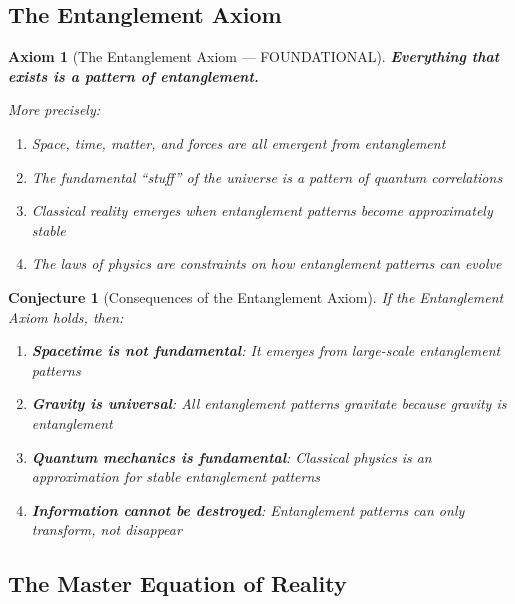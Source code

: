 \documentclass[12pt,a4paper]{article}
\newtheorem{conjecture}[theorem]{Conjecture}
\newtheorem{axiom}[theorem]{Axiom}
\begin{document}
\subsection{The Entanglement Axiom}

\begin{axiom}[The Entanglement Axiom --- FOUNDATIONAL]
\textbf{Everything that exists is a pattern of entanglement.}

More precisely:
\begin{enumerate}
    \item Space, time, matter, and forces are all emergent from entanglement
    \item The fundamental ``stuff'' of the universe is a pattern of quantum correlations
    \item Classical reality emerges when entanglement patterns become approximately stable
    \item The laws of physics are constraints on how entanglement patterns can evolve
\end{enumerate}
\end{axiom}

\begin{conjecture}[Consequences of the Entanglement Axiom]
If the Entanglement Axiom holds, then:
\begin{enumerate}
    \item \textbf{Spacetime is not fundamental}: It emerges from large-scale entanglement patterns
    \item \textbf{Gravity is universal}: All entanglement patterns gravitate because gravity \textit{is} entanglement
    \item \textbf{Quantum mechanics is fundamental}: Classical physics is an approximation for stable entanglement patterns
    \item \textbf{Information cannot be destroyed}: Entanglement patterns can only transform, not disappear
\end{enumerate}
\end{conjecture}

\subsection{The Master Equation of Reality}
\end{document}
